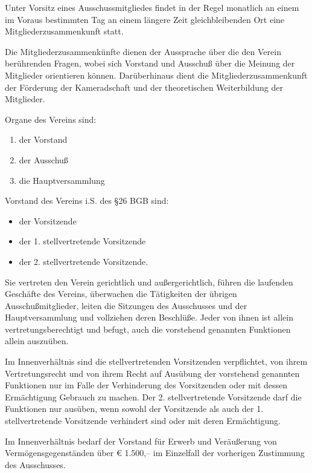 \documentclass[10pt,a4paper,parskip=half]{scrartcl}
\begin{document}
\begin{contract}
    Unter Vorsitz eines Ausschussmitgliedes findet in der Regel monatlich an einem im Voraus bestimmten Tag an einem längere Zeit gleichbleibenden Ort eine Mitgliederzusammenkunft statt.
    
    Die Mitgliederzusammenkünfte dienen der Aussprache über die den Verein berührenden Fragen,
    wobei sich Vorstand und Ausschuß über die Meinung der Mitglieder orientieren können.
    Darüberhinaus dient die Mitgliederzusammenkunft der Förderung der Kameradschaft und der theoretischen Weiterbildung der Mitglieder.
    
    Organe des Vereins sind:
    \begin{enumerate}[noitemsep]
      \item der Vorstand
      \item der Ausschuß
      \item die Hauptversammlung
    \end{enumerate}
    
    Vorstand des Vereins i.S. des §26 BGB sind:
    \begin{itemize}[noitemsep]
      \item der Vorsitzende
      \item der 1. stellvertretende Vorsitzende
      \item der 2. stellvertretende Vorsitzende.
    \end{itemize}
    Sie vertreten den Verein gerichtlich und außergerichtlich,
    führen die laufenden Geschäfte des Vereins,
    überwachen die Tätigkeiten der übrigen Ausschußmitglieder,
    leiten die Sitzungen des Ausschusses und der Hauptversammlung und vollziehen deren Beschlüße.
    Jeder von ihnen ist allein vertretungsberechtigt und befugt,
    auch die vorstehend genannten Funktionen allein auszuüben.
    
    Im Innenverhältnis sind die stellvertretenden Vorsitzenden verpflichtet,
    von ihrem Vertretungsrecht und von ihrem Recht auf Ausübung der vorstehend genannten Funktionen nur im Falle der Verhinderung des Vorsitzenden oder mit dessen Ermächtigung Gebrauch zu machen.
    Der 2. stellvertretende Vorsitzende darf die Funktionen nur ausüben,
    wenn sowohl der
    Vorsitzende als auch der 1. stellvertretende Vorsitzende verhindert sind oder mit deren Ermächtigung.
    
    Im Innenverhältnis bedarf der Vorstand für Erwerb und Veräußerung von Vermögensgegenständen über € 1.500,-- im Einzelfall der vorherigen Zustimmung des Ausschusses.
    

\end{contract}
\end{document}

